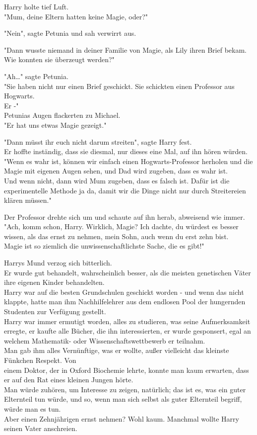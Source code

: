 {Harry holte tief Luft.\\ "Mum, deine Eltern hatten keine Magie, oder?"

"Nein", sagte Petunia und sah verwirrt aus.

"Dann wusste niemand in deiner Familie von Magie, als Lily ihren Brief bekam. Wie konnten sie überzeugt werden?"

"Ah…" sagte Petunia.\\ "Sie haben nicht nur einen Brief geschickt. Sie schickten einen Professor aus Hogwarts.\\ Er -"\\ Petunias Augen flackerten zu Michael.\\ "Er hat uns etwas Magie gezeigt."

"Dann müsst ihr euch nicht darum streiten", sagte Harry fest.\\ Er hoffte inständig, dass sie diesmal, nur dieses eine Mal, auf ihn hören würden.\\ "Wenn es wahr ist, können wir einfach einen Hogwarts-Professor herholen und die Magie mit eigenen Augen sehen, und Dad wird zugeben, dass es wahr ist.\\ Und wenn nicht, dann wird Mum zugeben, dass es falsch ist. Dafür ist die experimentelle Methode ja da, damit wir die Dinge nicht nur durch Streitereien klären müssen."

Der Professor drehte sich um und schaute auf ihn herab, abweisend wie immer.\\ "Ach, komm schon, Harry. Wirklich, Magie? Ich dachte, du würdest es besser wissen, als das ernst zu nehmen, mein Sohn, auch wenn du erst zehn bist.\\ Magie ist so ziemlich die unwissenschaftlichste Sache, die es gibt!"

Harrys Mund verzog sich bitterlich.\\ Er wurde gut behandelt, wahrscheinlich besser, als die meisten genetischen Väter ihre eigenen Kinder behandelten.\\ Harry war auf die besten Grundschulen geschickt worden - und wenn das nicht klappte, hatte man ihm Nachhilfelehrer aus dem endlosen Pool der hungernden Studenten zur Verfügung gestellt.\\ Harry war immer ermutigt worden, alles zu studieren, was seine Aufmerksamkeit erregte, er kaufte alle Bücher, die ihn interessierten, er wurde gesponsert, egal an welchem Mathematik- oder Wissenschaftswettbewerb er teilnahm.\\ Man gab ihm alles Vernünftige, was er wollte, außer vielleicht das kleinste Fünkchen Respekt. Von\\ einem Doktor, der in Oxford Biochemie lehrte, konnte man kaum erwarten, dass er auf den Rat eines kleinen Jungen hörte.\\ Man würde zuhören, um Interesse zu zeigen, natürlich; das ist es, was ein guter Elternteil tun würde, und so, wenn man sich selbst als guter Elternteil begriff, würde man es tun.\\ Aber einen Zehnjährigen ernst nehmen? Wohl kaum. Manchmal wollte Harry seinen Vater anschreien.

}
